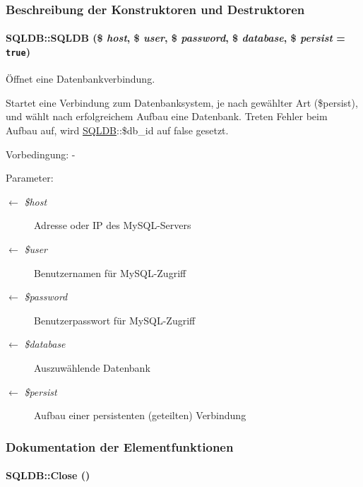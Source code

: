 \subsubsection{Beschreibung der Konstruktoren und Destruktoren}
\hypertarget{classSQLDB_069ba0502ed4bfedb72768a03ff6854d}{
\paragraph[SQLDB]{\setlength{\rightskip}{0pt plus 5cm}SQLDB::SQLDB (\$ {\em host}, \$ {\em user}, \$ {\em password}, \$ {\em database}, \$ {\em persist} = {\tt true})}\hfill}
\label{classSQLDB_069ba0502ed4bfedb72768a03ff6854d}


Öffnet eine Datenbankverbindung. 

Startet eine Verbindung zum Datenbanksystem, je nach gewählter Art (\$persist), und wählt nach erfolgreichem Aufbau eine Datenbank. Treten Fehler beim Aufbau auf, wird \hyperlink{classSQLDB}{SQLDB}::\$db\_\-id auf false gesetzt. \begin{Desc}
\item[Vorbedingung:]- \end{Desc}
\begin{Desc}
\item[Parameter:]
\begin{description}
\item[\mbox{$\leftarrow$} {\em \$host}]Adresse oder IP des My\-SQL-Servers \item[\mbox{$\leftarrow$} {\em \$user}]Benutzernamen für My\-SQL-Zugriff \item[\mbox{$\leftarrow$} {\em \$password}]Benutzerpasswort für My\-SQL-Zugriff \item[\mbox{$\leftarrow$} {\em \$database}]Auszuwählende Datenbank \item[\mbox{$\leftarrow$} {\em \$persist}]Aufbau einer persistenten (geteilten) Verbindung \end{description}
\end{Desc}


\subsubsection{Dokumentation der Elementfunktionen}
\hypertarget{classSQLDB_0e82206260d6fc4d0eaec32022125048}{
\paragraph[Close]{\setlength{\rightskip}{0pt plus 5cm}SQLDB::Close ()}\hfill}
\label{classSQLDB_0e82206260d6fc4d0eaec32022125048}


